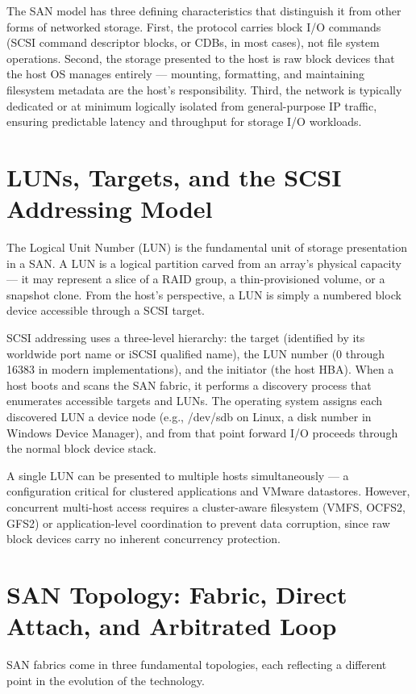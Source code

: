 The SAN model has three defining characteristics that distinguish it from other forms of networked storage. First, the protocol carries block I/O commands (SCSI command descriptor blocks, or CDBs, in most cases), not file system operations. Second, the storage presented to the host is raw block devices that the host OS manages entirely --- mounting, formatting, and maintaining filesystem metadata are the host's responsibility. Third, the network is typically dedicated or at minimum logically isolated from general-purpose IP traffic, ensuring predictable latency and throughput for storage I/O workloads.

\section{LUNs, Targets, and the SCSI Addressing Model}
The Logical Unit Number (LUN) is the fundamental unit of storage presentation in a SAN. A LUN is a logical partition carved from an array's physical capacity --- it may represent a slice of a RAID group, a thin-provisioned volume, or a snapshot clone. From the host's perspective, a LUN is simply a numbered block device accessible through a SCSI target.

SCSI addressing uses a three-level hierarchy: the target (identified by its worldwide port name or iSCSI qualified name), the LUN number (0 through 16383 in modern implementations), and the initiator (the host HBA). When a host boots and scans the SAN fabric, it performs a discovery process that enumerates accessible targets and LUNs. The operating system assigns each discovered LUN a device node (e.g., /dev/sdb on Linux, a disk number in Windows Device Manager), and from that point forward I/O proceeds through the normal block device stack.

A single LUN can be presented to multiple hosts simultaneously --- a configuration critical for clustered applications and VMware datastores. However, concurrent multi-host access requires a cluster-aware filesystem (VMFS, OCFS2, GFS2) or application-level coordination to prevent data corruption, since raw block devices carry no inherent concurrency protection.

\section{SAN Topology: Fabric, Direct Attach, and Arbitrated Loop}
SAN fabrics come in three fundamental topologies, each reflecting a different point in the evolution of the technology.

